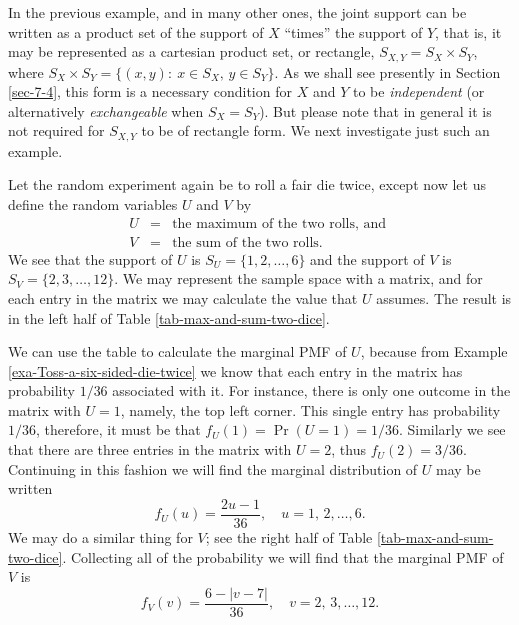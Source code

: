 \documentclass[captions=tableheading]{scrbook}
\begin{document}
In the previous example, and in many other ones, the joint support can be written as a product set of the support of \(X\) ``times'' the support of \(Y\), that is, it may be represented as a cartesian product set, or rectangle, \(S_{X,Y}=S_{X}\times S_{Y}\), where \(S_{X} \times S_{Y}= \{ (x,y):\ x\in S_{X},\, y\in S_{Y} \} \). As we shall see presently in Section \ref{sec-7-4}, this form is a necessary condition for \(X\) and \(Y\) to be \emph{independent} (or alternatively \emph{exchangeable} when \(S_{X}=S_{Y}\)). But please note that in general it is not required for \(S_{X,Y}\) to be of rectangle form. We next investigate just such an example.


\begin{example}

Let the random experiment again be to roll a fair die twice, except now let us define the random variables \(U\) and \(V\) by
\begin{eqnarray*}
U & = & \mbox{the maximum of the two rolls, and }\\
V & = & \mbox{the sum of the two rolls.}
\end{eqnarray*}
We see that the support of \(U\) is \(S_{U}= \{ 1,2,\ldots,6 \} \) and the support of \(V\) is \(S_{V}= \{ 2,3,\ldots,12 \} \). We may represent the sample space with a matrix, and for each entry in the matrix we may calculate the value that \(U\) assumes. The result is in the left half of Table \ref{tab-max-and-sum-two-dice}. 

We can use the table to calculate the marginal PMF of \(U\), because from Example \ref{exa-Toss-a-six-sided-die-twice} we know that each entry in the matrix has probability \(1/36\) associated with it. For instance, there is only one outcome in the matrix with \(U=1\), namely, the top left corner. This single entry has probability \(1/36\), therefore, it must be that \(f_{U}(1)=\Pr(U=1)=1/36\). Similarly we see that there are three entries in the matrix with \(U=2\), thus \(f_{U}(2)=3/36\). Continuing in this fashion we will find the marginal distribution of \(U\) may be written
\begin{equation}
f_{U}(u)=\frac{2u-1}{36},\quad u=1,\,2,\ldots,6.
\end{equation}
We may do a similar thing for \(V\); see the right half of Table \ref{tab-max-and-sum-two-dice}. Collecting all of the probability we will find that the marginal PMF of \(V\) is
\begin{equation}
f_{V}(v)=\frac{6-|v-7|}{36},\quad v=2,\,3,\ldots,12.
\end{equation}









\end{example}
\end{document}
